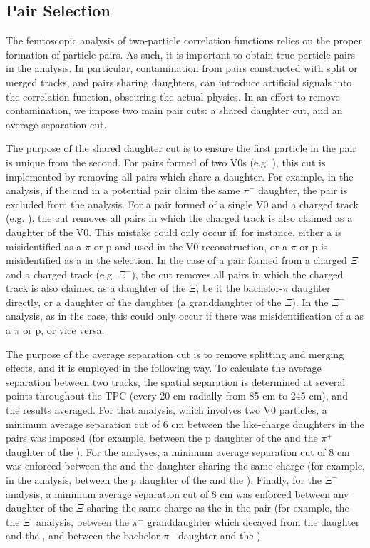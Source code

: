 \documentclass[/home/jesse/Analysis/FemtoAnalysis/AnalysisNotes/AnalysisNoteJBuxton.tex]{subfiles}
\begin{document}
\subsection{Pair Selection}
\label{PairSelection}

The femtoscopic analysis of two-particle correlation functions relies on the proper formation of particle pairs.
As such, it is important to obtain true particle pairs in the analysis.  
In particular, contamination from pairs constructed with split or merged tracks, and pairs sharing daughters, can introduce artificial signals into the correlation function, obscuring the actual physics.  
In an effort to remove contamination, we impose two main pair cuts: a shared daughter cut, and an average separation cut.  

The purpose of the shared daughter cut is to ensure the first particle in the pair is unique from the second.  
For pairs formed of two V0s (e.g. \LamKs), this cut is implemented by removing all pairs which share a daughter.
For example, in the \LamKs analysis, if the \Lam and \Ks in a potential pair claim the same $\pi^{-}$ daughter, the pair is excluded from the analysis.  
For a pair formed of a single V0 and a charged track (e.g. \LamKpm), the cut removes all pairs in which the charged track is also claimed as a daughter of the V0.  
This mistake could only occur if, for instance, either a \Kpm is misidentified as a $\pi$ or p and used in the V0 reconstruction, or a $\pi$ or p is misidentified as a \Kpm in the \Kpm selection.
In the case of a pair formed from a charged $\Xi$ and a charged track (e.g. $\Xi^{-}$\Kpm), the cut removes all pairs in which the charged track is also claimed as a daughter of the $\Xi$, be it the bachelor-$\pi$ daughter directly, or a daughter of the \Lam daughter (a granddaughter of the $\Xi$). 
In the $\Xi^{-}$\Kpm analysis, as in the \LamKpm case, this could only occur if there was misidentification of a \Kpm as a $\pi$ or p, or vice versa.

The purpose of the average separation cut is to remove splitting and merging effects, and it is employed in the following way.  
To calculate the average separation between two tracks, the spatial separation is determined at several points throughout the TPC (every 20 cm radially from 85 cm to 245 cm), and the results averaged.
For that \LamKs analysis, which involves two V0 particles, a minimum average separation cut of 6 cm between the like-charge daughters in the pairs was imposed (for example, between the p daughter of the \Lam and the $\pi^{+}$ daughter of the \Ks).
For the \LamKpm analyses, a minimum average separation cut of 8 cm was enforced between the \Kpm and the \Lam daughter sharing the same charge (for example, in the \LamKchP analysis, between the p daughter of the \Lam and the \KchP).
Finally, for the $\Xi^{-}$\Kpm analysis, a minimum average separation cut of 8 cm was enforced between any daughter of the $\Xi$ sharing the same charge as the \Kpm in the pair (for example, the the $\Xi^{-}$\KchM analysis, between the $\pi^{-}$ granddaughter which decayed from the \Lam daughter and the \KchM, and between the bachelor-$\pi^{-}$ daughter and the \KchM).
\end{document}
